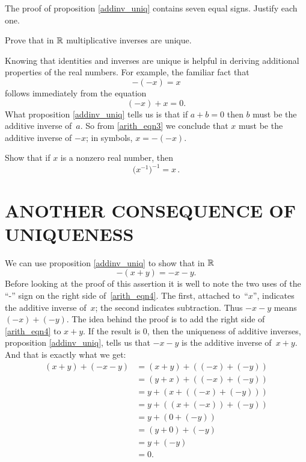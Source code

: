 \begin{prob} The proof of proposition \eqref{addinv_uniq} contains seven equal signs.  Justify each one.
\end{prob}

\begin{prob} Prove that in $\mathbb{R}$ multiplicative inverses are unique.
\end{prob}

\begin{exam} Knowing that identities and inverses are unique is helpful in deriving additional
properties of the real numbers.  For example, the familiar fact that
  \[ -(-x) = x \]
follows immediately from the equation
  \begin{equation}\label{arith_eqn3} (-x) + x = 0.
  \end{equation}
What proposition \ref{addinv_uniq} tells us is that if $a + b = 0$ then $b$ must be the
additive inverse of~$a$.  So from \eqref{arith_eqn3} we conclude that $x$ must be the additive
inverse of $-x$; in symbols, $x = -(-x)$.
\end{exam}

\begin{prob} Show that if $x$ is a nonzero real number, then
  \[ \bigl(x^{-1}\bigr)^{-1} = x\,. \]
\end{prob}

\section{ANOTHER CONSEQUENCE OF UNIQUENESS}  We can use proposition \ref{addinv_uniq} to show
that in $\mathbb{R}$
  \begin{equation}\label{arith_eqn4} -(x + y) = - x - y.
  \end{equation}
Before looking at the proof of this assertion it is well to note the two uses of the ``-''
sign on the right side of~\eqref{arith_eqn4}. The first, attached to~``$x$'', indicates the
additive inverse of~$x$; the second indicates subtraction. Thus $-x-y$ means $(-x) + (-y)$.
The idea behind the proof is to add the right side of \eqref{arith_eqn4} to $x + y$. If the
result is $0$, then the uniqueness of additive inverses, proposition \ref{addinv_uniq}, tells
us that $-x-y$ is the additive inverse of~$x+y$.  And that is exactly what we get:
  \begin{align*}
     (x + y) + (-x -y) &= (x + y) + ((-x) + (-y)) \\
                       &= (y + x) + ((-x) + (-y)) \\
                       &= y + (x + ((-x) + (-y))) \\
                       &= y + ((x + (-x)) + (-y)) \\
                       &= y + (0 + (-y)) \\
                       &= (y + 0) + (-y) \\
                       &= y + (-y) \\
                       &= 0.
  \end{align*}

